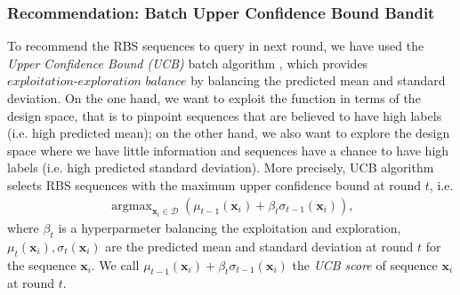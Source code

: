 
\subsubsection{Recommendation: Batch Upper Confidence Bound Bandit}

To recommend the RBS sequences to query in next round, we have used the \textit{Upper Confidence Bound (UCB)} batch algorithm \cite{srinivas2012information}, which provides  $\textit{exploitation-exploration balance}$ by balancing the predicted mean and standard deviation.
On the one hand, we want to exploit the function in terms of the design space, that is to pinpoint sequences that are believed to have high labels (i.e. high predicted mean); 
on the other hand, we also want to explore the design space where we have little information and sequences have a chance to have high labels (i.e. high predicted standard deviation).
More precisely, UCB algorithm selects RBS sequences with the maximum upper confidence bound at round $t$, i.e.
\begin{align}
\label{Eq: GPUCB}
    \operatorname{argmax}_{\mathbf{x}_i \in \mathcal{D}} \left( \mu_{t-1}(\mathbf{x}_i) + \beta_t \sigma_{t-1}(\mathbf{x}_i)\right),
\end{align}
where $\beta_t$ is a hyperparmeter balancing the exploitation and exploration, 
$\mu_t(\mathbf{x}_i), \sigma_t(\mathbf{x}_i)$ are the predicted mean and standard deviation at round $t$ for the sequence $\mathbf{x}_i$.
We call $\mu_{t-1}(\mathbf{x}_i) + \beta_t \sigma_{t-1}(\mathbf{x}_i)$ the \textit{UCB score} of sequence $\mathbf{x}_i$ at round $t$.


